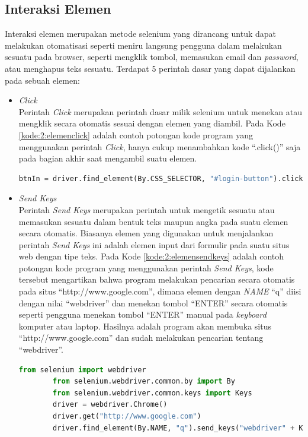 \subsection{Interaksi Elemen}
Interaksi elemen merupakan metode selenium yang dirancang untuk dapat melakukan otomatisasi seperti meniru langsung pengguna dalam melakukan sesuatu pada browser, seperti mengklik tombol, memasukan email dan \textit{password}, atau menghapus teks sesuatu. Terdapat 5 perintah dasar yang dapat dijalankan pada sebuah elemen:
\begin{itemize}
	\item \textit{Click}\\
	Perintah \textit{Click} merupakan perintah dasar milik selenium untuk menekan atau mengklik secara otomatis sesuai dengan elemen yang diambil. Pada Kode \ref{kode:2:elemenclick} adalah contoh potongan kode program yang menggunakan perintah \textit{Click}, hanya cukup menambahkan kode ``.click()'' saja pada bagian akhir saat mengambil suatu elemen.
	\begin{lstlisting}[language=python, caption=Contoh Potongan Kode Perintah \textit{Click} pada Suatu Elemen, label=kode:2:elemenclick]
		btnIn = driver.find_element(By.CSS_SELECTOR, "#login-button").click()
	\end{lstlisting}
	
	\item \textit{Send Keys}\\
	Perintah \textit{Send Keys} merupakan perintah untuk mengetik sesuatu atau memasukan sesuatu dalam bentuk teks maupun angka pada suatu elemen secara otomatis. Biasanya elemen yang digunakan untuk menjalankan perintah \textit{Send Keys} ini adalah elemen input dari formulir pada suatu situs web dengan tipe teks. Pada Kode \ref{kode:2:elemensendkeys} adalah contoh potongan kode program yang menggunakan perintah \textit{Send Keys}, kode tersebut mengartikan bahwa program melakukan pencarian secara otomatis pada situs ``http://www.google.com'', dimana elemen dengan \textit{NAME} ``q'' diisi dengan nilai ``webdriver'' dan menekan tombol ``ENTER'' secara otomatis seperti pengguna menekan tombol ``ENTER'' manual pada \textit{keyboard} komputer atau laptop. Hasilnya adalah program akan membuka situs ``http://www.google.com'' dan sudah melakukan pencarian tentang ``webdriver''.
	\begin{lstlisting}[language=python, caption=Contoh Potongan Kode Perintah \textit{Send Keys} pada Suatu Elemen, label=kode:2:elemensendkeys]
		from selenium import webdriver
		from selenium.webdriver.common.by import By
		from selenium.webdriver.common.keys import Keys
		driver = webdriver.Chrome()
		driver.get("http://www.google.com")
		driver.find_element(By.NAME, "q").send_keys("webdriver" + Keys.ENTER)
	\end{lstlisting}
	

\end{itemize}
